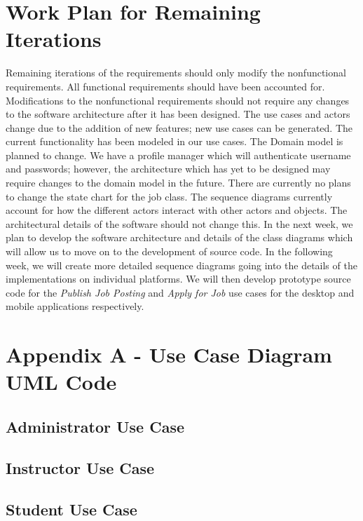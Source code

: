 \documentclass[12pt,openany]{report}
\begin{document}
\chapter{Work Plan for Remaining Iterations}
Remaining iterations of the requirements should only modify the nonfunctional
requirements. All functional requirements should have been accounted for. Modifications to
the nonfunctional requirements should not require any changes to the software architecture
after it has been designed.
The use cases and actors change due to the addition of new features; new use cases can
be generated. The current functionality has been modeled in our use cases.
The Domain model is planned to change. We have a profile manager which will
authenticate username and passwords; however, the architecture which has yet to be designed
may require changes to the domain model in the future.
There are currently no plans to change the state chart for the job class.
The sequence diagrams currently account for how the different actors interact with
other actors and objects. The architectural details of the software should not change this.
In the next week, we plan to develop the software architecture and details of the class
diagrams which will allow us to move on to the development of source code.
In the following week, we will create more detailed sequence diagrams going into the
details of the implementations on individual platforms. We will then develop prototype source
code for the \textit{Publish Job Posting} and \textit{Apply for Job} use cases for the desktop and mobile
applications respectively.
\chapter*{Appendix A - Use Case Diagram UML Code}
\label{appA}
\section*{Administrator Use Case}

\section*{Instructor Use Case}

\section*{Student Use Case}

\end{document}
